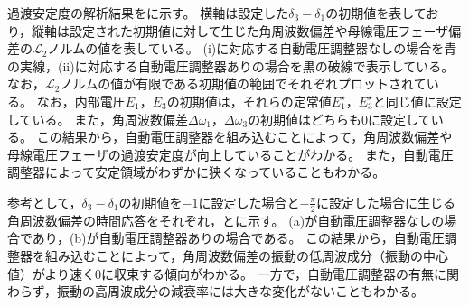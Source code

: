 \documentclass[tombow,dvipdfmx]{corona-a5-1.1}
\begin{document}
\begin{例}[自動電圧調整器による定態安定性と過渡安定度の変化]
過渡安定度の解析結果をに示す。
横軸は設定した$\delta_3-\delta_1$の初期値を表しており，縦軸は設定された初期値に対して生じた角周波数偏差や母線電圧フェーザ偏差の$\mathcal{L}_2$ノルムの値を表している。
(i)に対応する自動電圧調整器なしの場合を青の実線，(ii)に対応する自動電圧調整器ありの場合を黒の破線で表示している。
なお，$\mathcal{L}_2$ノルムの値が有限である初期値の範囲でそれぞれプロットされている。
なお，内部電圧$E_1$，$E_3$の初期値は，それらの定常値$E_1^{\star}$，$E_3^{\star}$と同じ値に設定している。
また，角周波数偏差$\Delta \omega_1$，$\Delta \omega_3$の初期値はどちらも0に設定している。
この結果から，自動電圧調整器を組み込むことによって，角周波数偏差や母線電圧フェーザの過渡安定度が向上していることがわかる。
また，自動電圧調整器によって安定領域がわずかに狭くなっていることもわかる。

参考として，$\delta_3-\delta_1$の初期値を$-1$に設定した場合と$-\tfrac{\pi}{2}$に設定した場合に生じる角周波数偏差の時間応答をそれぞれ，とに示す。
(a)が自動電圧調整器なしの場合であり，(b)が自動電圧調整器ありの場合である。
この結果から，自動電圧調整器を組み込むことによって，角周波数偏差の振動の低周波成分（振動の中心値）がより速く0に収束する傾向がわかる。
一方で，自動電圧調整器の有無に関わらず，振動の高周波成分の減衰率には大きな変化がないこともわかる。
\end{例}



\end{document}
